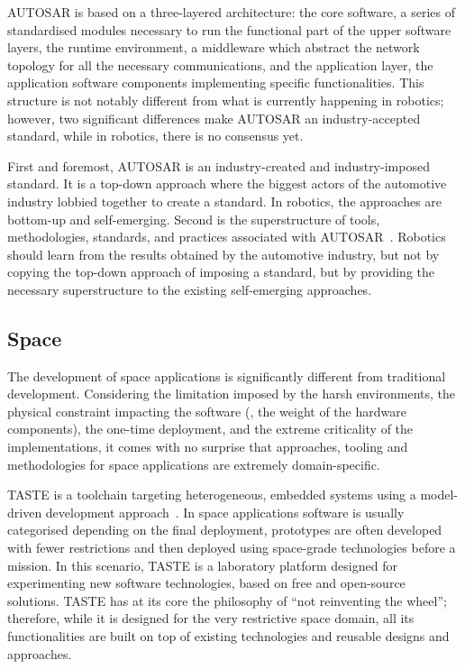 AUTOSAR is based on a three-layered architecture: the core software, a series of standardised modules necessary to run the functional part of the upper software layers, the runtime environment, a middleware which abstract the network topology for all the necessary communications, and the application layer, the application software components implementing specific functionalities. This structure is not notably different from what is currently happening in robotics; however, two significant differences make AUTOSAR an industry-accepted standard, while in robotics, there is no consensus yet.

First and foremost, AUTOSAR is an industry-created and in\-dus\-try-imposed standard. It is a top-down approach where the biggest actors of the automotive industry lobbied together to create a standard. In robotics, the approaches are bottom-up and self-emerging. Second is the superstructure of tools, methodologies, standards, and practices associated with AUTOSAR~\cite{arts2015testing, anssi2011enabling, giese2010model}. Robotics should learn from the results obtained by the automotive industry, but not by copying the top-down approach of imposing a standard, but by providing the necessary superstructure to the existing self-emerging approaches.

\subsection{Space}
The development of space applications is significantly different from traditional development. Considering the limitation imposed by the harsh environments, the physical constraint impacting the software (\eg, the weight of the hardware components), the one-time deployment, and the extreme criticality of the implementations, it comes with no surprise that approaches, tooling and methodologies for space applications are extremely domain-specific.

TASTE is a toolchain targeting heterogeneous, embedded systems using a model-driven development approach~\cite{perrotin2010taste}. In space applications software is usually categorised depending on the final deployment, prototypes are often developed with fewer restrictions and then deployed using space-grade technologies before a mission. In this scenario, TASTE is a laboratory platform designed for experimenting new software technologies, based on free and open-source solutions. TASTE has at its core the philosophy of ``not reinventing the wheel''; therefore, while it is designed for the very restrictive space domain, all its functionalities are built on top of existing technologies and reusable designs and approaches.

